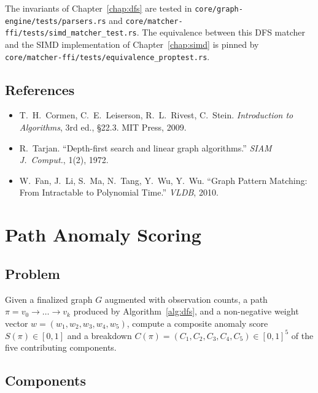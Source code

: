 \documentclass[11pt,openany]{book}
\begin{document}
\begin{implnote}
The invariants of Chapter~\ref{chap:dfs} are tested in
\texttt{core/graph-engine/tests/parsers.rs} and
\texttt{core/matcher-ffi/tests/simd\_matcher\_test.rs}. The equivalence
between this DFS matcher and the SIMD implementation of
Chapter~\ref{chap:simd} is pinned by
\texttt{core/matcher-ffi/tests/equivalence\_proptest.rs}.
\end{implnote}

\section{References}
\label{sec:dfs:refs}
\begin{itemize}
  \item T.~H.~Cormen, C.~E.~Leiserson, R.~L.~Rivest, C.~Stein.
        \emph{Introduction to Algorithms}, 3rd ed., \S22.3.
        MIT Press, 2009.~\cite{clrs}
  \item R.~Tarjan. ``Depth-first search and linear graph
        algorithms.'' \emph{SIAM J.\ Comput.}, 1(2), 1972.
  \item W.~Fan, J.~Li, S.~Ma, N.~Tang, Y.~Wu, Y.~Wu. ``Graph Pattern
        Matching: From Intractable to Polynomial Time.''
        \emph{VLDB}, 2010.
\end{itemize}

\chapter{Path Anomaly Scoring}
\label{chap:scoring}

\section{Problem}
\label{sec:scoring:problem}

\begin{problem}
\label{prob:scoring}
Given a finalized graph $G$ augmented with observation counts, a
path $\pi = v_0 \to \dots \to v_k$ produced by
Algorithm~\ref{alg:dfs}, and a non-negative weight vector
$w = (w_1, w_2, w_3, w_4, w_5)$, compute a composite anomaly score
$S(\pi) \in [0, 1]$ and a breakdown
$C(\pi) = (C_1, C_2, C_3, C_4, C_5) \in [0,1]^5$ of the five
contributing components.
\end{problem}

\section{Components}
\label{sec:scoring:components}
\end{document}
